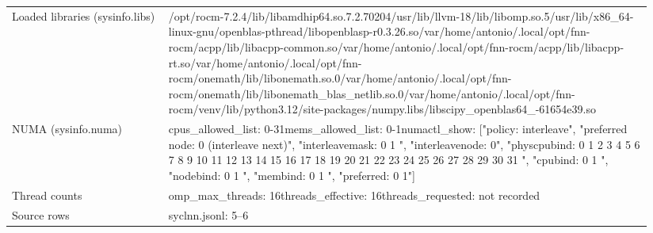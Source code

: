 \begin{longtable}{>{\raggedright\arraybackslash}p{0.23\linewidth}>{\raggedright\arraybackslash}p{0.71\linewidth}}
Loaded libraries (sysinfo.libs) & /\allowbreak{}opt/\allowbreak{}rocm-7.2.4/\allowbreak{}lib/\allowbreak{}libamdhip64.so.7.2.70204\newline /\allowbreak{}usr/\allowbreak{}lib/\allowbreak{}llvm-18/\allowbreak{}lib/\allowbreak{}libomp.so.5\newline /\allowbreak{}usr/\allowbreak{}lib/\allowbreak{}x86\_\allowbreak{}64-linux-gnu/\allowbreak{}openblas-pthread/\allowbreak{}libopenblasp-r0.3.26.so\newline /\allowbreak{}var/\allowbreak{}home/\allowbreak{}antonio/\allowbreak{}.local/\allowbreak{}opt/\allowbreak{}fnn-rocm/\allowbreak{}acpp/\allowbreak{}lib/\allowbreak{}libacpp-common.so\newline /\allowbreak{}var/\allowbreak{}home/\allowbreak{}antonio/\allowbreak{}.local/\allowbreak{}opt/\allowbreak{}fnn-rocm/\allowbreak{}acpp/\allowbreak{}lib/\allowbreak{}libacpp-rt.so\newline /\allowbreak{}var/\allowbreak{}home/\allowbreak{}antonio/\allowbreak{}.local/\allowbreak{}opt/\allowbreak{}fnn-rocm/\allowbreak{}onemath/\allowbreak{}lib/\allowbreak{}libonemath.so.0\newline /\allowbreak{}var/\allowbreak{}home/\allowbreak{}antonio/\allowbreak{}.local/\allowbreak{}opt/\allowbreak{}fnn-rocm/\allowbreak{}onemath/\allowbreak{}lib/\allowbreak{}libonemath\_\allowbreak{}blas\_\allowbreak{}netlib.so.0\newline /\allowbreak{}var/\allowbreak{}home/\allowbreak{}antonio/\allowbreak{}.local/\allowbreak{}opt/\allowbreak{}fnn-rocm/\allowbreak{}venv/\allowbreak{}lib/\allowbreak{}python3.12/\allowbreak{}site-packages/\allowbreak{}numpy.libs/\allowbreak{}libscipy\_\allowbreak{}openblas64\_\allowbreak{}-61654e39.so \\
NUMA (sysinfo.numa) & cpus\_\allowbreak{}allowed\_\allowbreak{}list: 0-31\newline mems\_\allowbreak{}allowed\_\allowbreak{}list: 0-1\newline numactl\_\allowbreak{}show: ["policy: interleave", "preferred node: 0 (interleave next)", "interleavemask: 0 1 ", "interleavenode: 0", "physcpubind: 0 1 2 3 4 5 6 7 8 9 10 11 12 13 14 15 16 17 18 19 20 21 22 23 24 25 26 27 28 29 30 31 ", "cpubind: 0 1 ", "nodebind: 0 1 ", "membind: 0 1 ", "preferred: 0 1"] \\
Thread counts & omp\_\allowbreak{}max\_\allowbreak{}threads: 16\newline threads\_\allowbreak{}effective: 16\newline threads\_\allowbreak{}requested: not recorded \\
Source rows & syclnn.jsonl: 5–6 \\
\end{longtable}
